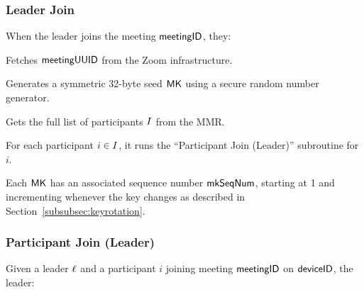 \subsubsection{Leader Join}

When the leader joins the meeting ${\sf meetingID}$, they:

\begingroup
\RaggedRight
\begin{enumerate*}
\item Fetches ${\sf meetingUUID}$ from the Zoom infrastructure.
\item Generates a symmetric 32-byte seed ${\sf MK}$ using a secure random number generator.
\item Gets the full list of participants $I$ from the MMR.
\item For each participant $i \in I$, it runs the ``Participant Join (Leader)'' subroutine for $i$.
\end{enumerate*}
\endgroup

Each ${\sf MK}$ has an associated sequence number $\mathsf{mkSeqNum}$, starting at 1 and incrementing
whenever the key changes as described in Section~\ref{subsubsec:keyrotation}.

\subsubsection{Participant Join (Leader)}
\label{subsubsec:participantjoinleader}

Given a leader $\ell$ and a participant $i$ joining meeting ${\sf meetingID}$ on ${\sf deviceID}$, the leader:

